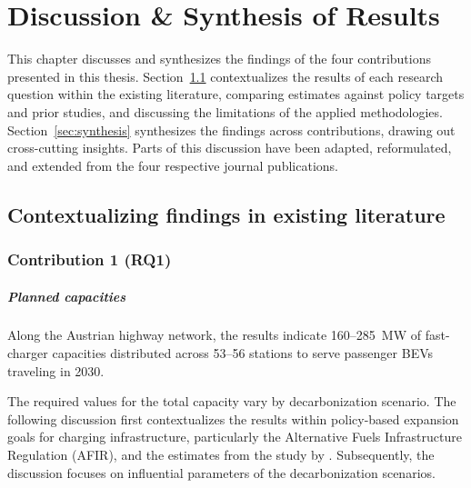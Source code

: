 \chapter{Discussion \& Synthesis of Results} \label{sec:discussion}
This chapter discusses and synthesizes the findings of the four contributions presented in this thesis. Section~\ref{sec:contextualization} contextualizes the results of each research question within the existing literature, comparing estimates against policy targets and prior studies, and discussing the limitations of the applied methodologies. Section~\ref{sec:synthesis} synthesizes the findings across contributions, drawing out cross-cutting insights. Parts of this discussion have been adapted, reformulated, and extended from the four respective journal publications.

\section{Contextualizing findings in existing literature} \label{sec:contextualization}

\subsection{Contribution 1 (RQ1)}
\noindent{}

\paragraph*{Planned capacities}
Along the Austrian highway network, the results indicate 160--285~MW of fast-charger capacities distributed across 53--56 stations to serve passenger \acp{BEV} traveling in 2030.

The required values for the total capacity vary by decarbonization scenario. The following discussion first contextualizes the results within policy-based expansion goals for charging infrastructure, particularly the Alternative Fuels Infrastructure Regulation (AFIR), and the estimates from the study by \citet{Jochem2019}. Subsequently, the discussion focuses on influential parameters of the decarbonization scenarios.

